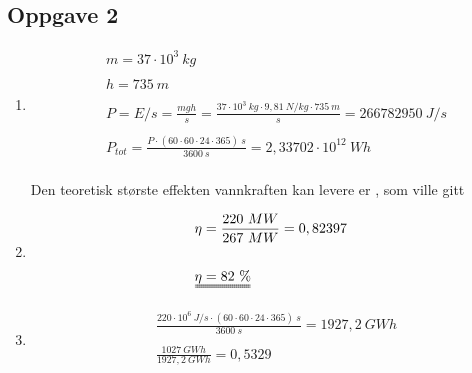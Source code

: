 \documentclass[11pt,a4paper]{report}
\newcommand{\opg}[1]{\subsection*{Oppgave #1}}
\newcommand{\opgd}[1]{\item[#1)]}
\begin{document}
\newpage

\opg{2}
\begin{enumerate}[leftmargin=*,itemsep=2cm,labelsep=2em,label=\alph*)]
\opgd{a}
\begin{align*}
&m = 37 \cdot 10^3\ kg\\\\
&h = 735\ m\\\\
&P = E/s = \frac{mgh}{s} = \frac{37 \cdot 10^3\ kg \cdot 9,81\ N/kg \cdot 735\ m}{s} = 266782950\ J/s\\\\
&P_{tot} = \frac{P \cdot (60 \cdot 60 \cdot 24 \cdot 365)\ s}{3600\ s} = 2,33702 \cdot 10^{12}\ Wh\\
\end{align*}

Den teoretisk største effekten vannkraften kan levere er , som ville gitt 

\opgd{b}
\begin{align*}
&\eta = \frac{220\ MW}{267\ MW} = 0,82397\\\\
&\uuline{\eta = 82\ \%}
\end{align*}

\opgd{c}
\begin{align*}
&\frac{220 \cdot 10^6\ J/s \cdot (60 \cdot 60 \cdot 24 \cdot 365)\ s}{3600\ s} = 1927,2\ GWh\\\\
&\frac{1027\ GWh}{1927,2\ GWh} = 0,5329\\
\end{align*}

\end{enumerate}

\newpage
\end{document}
